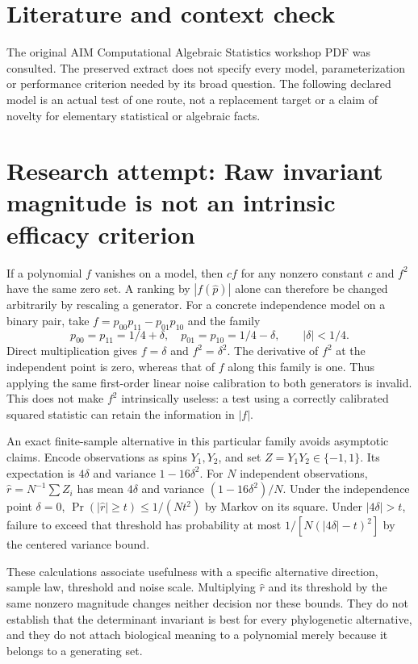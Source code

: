 \documentclass[11pt]{article}
\begin{document}
\section{Literature and context check}
The original AIM Computational Algebraic Statistics
 workshop PDF was consulted. The preserved extract does not specify every model,
 parameterization or performance criterion needed by its broad question. The
 following declared model is an actual test of one route, not a replacement
 target or a claim of novelty for elementary statistical or algebraic facts.
\section{Research attempt: Raw invariant magnitude is not an intrinsic efficacy criterion}
If a polynomial $f$ vanishes on a model, then $cf$ for any nonzero constant
$c$ and $f^2$ have the same zero set. A ranking by $|f(\widehat p)|$ alone
can therefore be changed arbitrarily by rescaling a generator. For a concrete
independence model on a binary pair, take
$f=p_{00}p_{11}-p_{01}p_{10}$ and the family
\[
 p_{00}=p_{11}=1/4+\delta,\quad
 p_{01}=p_{10}=1/4-\delta,\qquad |\delta|<1/4.
\]
Direct multiplication gives $f=\delta$ and $f^2=\delta^2$. The derivative of
$f^2$ at the independent point is zero, whereas that of $f$ along this family
is one. Thus applying the same first-order linear noise calibration to both
generators is invalid. This does not make $f^2$ intrinsically useless: a test
using a correctly calibrated squared statistic can retain the information in
$|f|$.

An exact finite-sample alternative in this particular family avoids asymptotic
claims. Encode observations as spins $Y_1,Y_2$, and set
$Z=Y_1Y_2\in\{-1,1\}$. Its expectation is $4\delta$ and variance
$1-16\delta^2$. For $N$ independent observations,
$\widehat r=N^{-1}\sum Z_i$ has mean $4\delta$ and variance
$(1-16\delta^2)/N$. Under the independence point $\delta=0$,
$\Pr(|\widehat r|\ge t)\le1/(Nt^2)$ by Markov on its square.
Under $|4\delta|>t$, failure to exceed that threshold has probability at most
$1/[N(|4\delta|-t)^2]$ by the centered variance bound.

These calculations associate usefulness with a specific alternative direction,
sample law, threshold and noise scale. Multiplying $\widehat r$ and its threshold
by the same nonzero magnitude changes neither decision nor these bounds.
They do not establish that the determinant invariant is best for every
phylogenetic alternative, and they do not attach biological meaning to a
polynomial merely because it belongs to a generating set.
\end{document}
